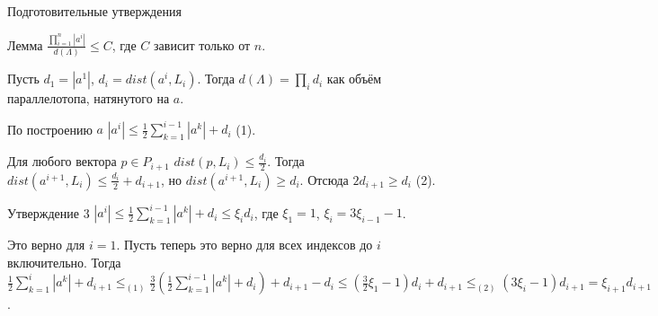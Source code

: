 \documentclass[10pt]{beamer}
\begin{document}
\begin{frame}{Подготовительные утверждения}

\begin{block}{Лемма}
  $\frac{\prod_{i=1}^n{\left|a^i\right|}}{d(\Lambda)} \leq C$, где $C$ зависит только от $n$.
\end{block}

\pause

Пусть $d_1 = \left|a^1\right|$, $d_i = dist(a^i,L_i)$. Тогда $d(\Lambda) = \prod_i{d_i}$ как объём параллелотопа, натянутого на $a$.\\

\pause

\vspace{0.2cm}
По построению $a$ $\left|a^i\right| \leq \frac{1}{2}\sum_{k=1}^{i-1}\left|a^k\right| + d_i$ (1).\\

\pause

\vspace{0.2cm}
Для любого вектора $p \in P_{i+1}$ $dist(p, L_i) \leq \frac{d_i}{2}$. Тогда $dist(a^{i+1},L_i) \leq \frac{d_i}{2} + d_{i+1}$, но $dist(a^{i+1},L_i) \geq d_i$. Отсюда $2d_{i+1} \geq d_i$ (2).

\pause

\vspace{0.2cm}
\begin{block}{Утверждение 3}
  $\left|a^i\right| \leq \frac{1}{2}\sum_{k=1}^{i-1}\left|a^k\right| + d_i \leq \xi_id_i$, где $\xi_1 = 1$, $\xi_i = 3\xi_{i-1} -1$.
\end{block}

Это верно для $i = 1$. Пусть теперь это верно для всех индексов до $i$ включительно. Тогда  $\frac{1}{2}\sum_{k=1}^{i}\left|a^k\right| + d_{i+1} \leq_{(1)} \frac{3}{2}(\frac{1}{2}\sum_{k=1}^{i-1}\left|a^k\right| + d_{i}) + d_{i+1} - d_i \leq (\frac{3}{2}\xi_1 - 1)d_i + d_{i+1} \leq_{(2)} (3\xi_i - 1)d_{i+1} = \xi_{i+1}d_{i+1}$. 

\end{frame}
\end{document}
